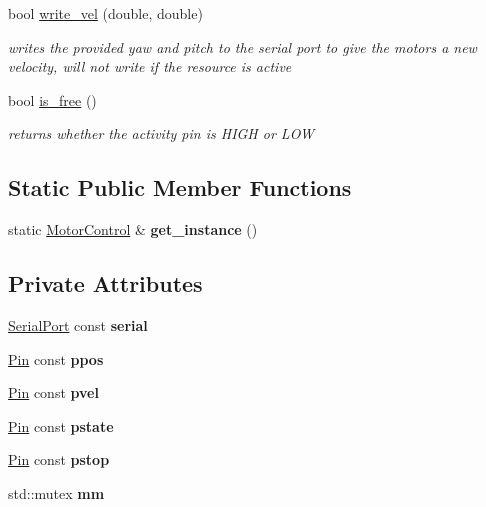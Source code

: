 \begin{DoxyCompactItemize}
bool \mbox{\hyperlink{structMotorControl_ae5ed3793c1b3e6f982bf6806ecce3978}{write\+\_\+vel}} (double, double)
\begin{DoxyCompactList}\small\item\em writes the provided yaw and pitch to the serial port to give the motors a new velocity, will not write if the resource is active \end{DoxyCompactList}\item 
bool \mbox{\hyperlink{structMotorControl_a9de35f14006d017df36b62d2c904249c}{is\+\_\+free}} ()
\begin{DoxyCompactList}\small\item\em returns whether the activity pin is H\+I\+GH or L\+OW \end{DoxyCompactList}\end{DoxyCompactItemize}
\subsection*{Static Public Member Functions}
\begin{DoxyCompactItemize}
\item 
\mbox{\label{structMotorControl_a7c001c25110ea459918b239f0bbd5801}} 
static \mbox{\hyperlink{structMotorControl}{Motor\+Control}} \& {\bfseries get\+\_\+instance} ()
\end{DoxyCompactItemize}
\subsection*{Private Attributes}
\begin{DoxyCompactItemize}
\item 
\mbox{\label{structMotorControl_ac78d113a124d1de77371c77d7b52fc2f}} 
\mbox{\hyperlink{classSerialPort}{Serial\+Port}} const {\bfseries serial}
\item 
\mbox{\label{structMotorControl_ac0acc1ad145c1d1e30a8c335e537ae05}} 
\mbox{\hyperlink{classPin}{Pin}} const {\bfseries ppos}
\item 
\mbox{\label{structMotorControl_acd2298cf7680cb360aa15d5588ce41cb}} 
\mbox{\hyperlink{classPin}{Pin}} const {\bfseries pvel}
\item 
\mbox{\label{structMotorControl_aecda6adda398b0367f44c287cbe7311f}} 
\mbox{\hyperlink{classPin}{Pin}} const {\bfseries pstate}
\item 
\mbox{\label{structMotorControl_a9b9b48901301826eb2b2892c6967bc13}} 
\mbox{\hyperlink{classPin}{Pin}} const {\bfseries pstop}
\item 
\mbox{\label{structMotorControl_a807d1fe97d6afc0ad367b5ed9c12a7e5}} 
std\+::mutex {\bfseries mm}
\end{DoxyCompactItemize}
